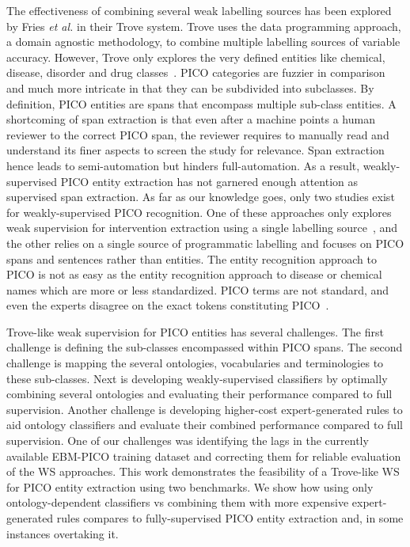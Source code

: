 \documentclass[10.7pt,]{article}
\begin{document}
The effectiveness of combining several weak labelling sources has been explored by Fries \textit{et al.} in their Trove system.
Trove uses the data programming approach, a domain agnostic methodology, to combine multiple labelling sources of variable accuracy.
However, Trove only explores the very defined entities like chemical, disease, disorder and drug classes~\cite{fries2021ontology}. 
PICO categories are fuzzier in comparison and much more intricate in that they can be subdivided into subclasses.
By definition, PICO entities are spans that encompass multiple sub-class entities.
A shortcoming of span extraction is that even after a machine points a human reviewer to the correct PICO span, the reviewer requires to manually read and understand its finer aspects to screen the study for relevance.
Span extraction hence leads to semi-automation but hinders full-automation.
As a result, weakly-supervised PICO entity extraction has not garnered enough attention as supervised span extraction.
As far as our knowledge goes, only two studies exist for weakly-supervised PICO recognition.
One of these approaches only explores weak supervision for intervention extraction using a single labelling source~\cite{dhrangadhariya2022distant}, and the other relies on a single source of programmatic labelling and focuses on PICO spans and sentences rather than entities.
The entity recognition approach to PICO is not as easy as the entity recognition approach to disease or chemical names which are more or less standardized.
PICO terms are not standard, and even the experts disagree on the exact tokens constituting PICO~\cite{brockmeier2019improving}.


Trove-like weak supervision for PICO entities has several challenges.
The first challenge is defining the sub-classes encompassed within PICO spans.
The second challenge is mapping the several ontologies, vocabularies and terminologies to these sub-classes.
Next is developing weakly-supervised classifiers by optimally combining several ontologies and evaluating their performance compared to full supervision.
Another challenge is developing higher-cost expert-generated rules to aid ontology classifiers and evaluate their combined performance compared to full supervision.
One of our challenges was identifying the lags in the currently available EBM-PICO training dataset and correcting them for reliable evaluation of the WS approaches.
This work demonstrates the feasibility of a Trove-like WS for PICO entity extraction using two benchmarks.
We show how using only ontology-dependent classifiers vs combining them with more expensive expert-generated rules compares to fully-supervised PICO entity extraction and, in some instances overtaking it.
%
%
%
\end{document}
